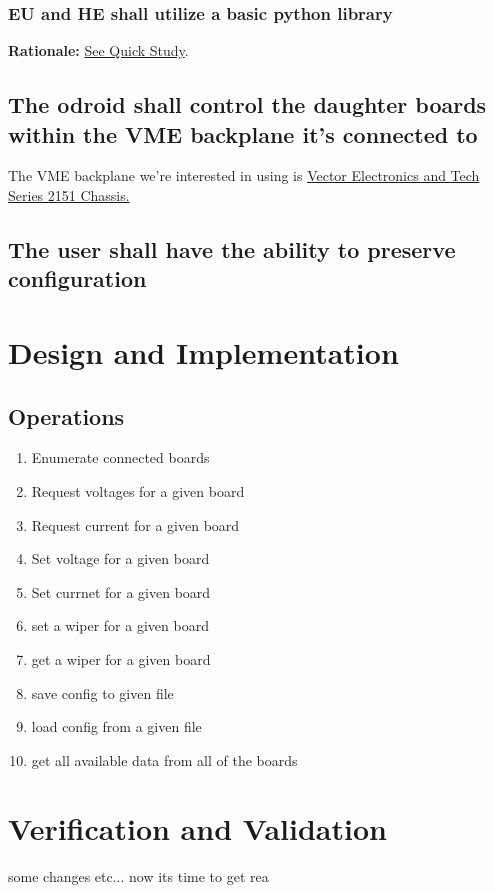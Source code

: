 \documentclass[11pt,letterpaper]{article}
\begin{document}
\subsubsection{EU and HE shall utilize a basic python library}
\textbf{Rationale:} \hyperref[sec:undefined_ui_req]{See Quick Study}.

\subsection{The odroid shall control the daughter boards within the VME backplane it's connected to}
The VME backplane we're interested in using is \href{https://www.vectorelect.com/series-2151.html}{Vector Electronics and Tech Series 2151 Chassis.}
\subsection{The user shall have the ability to preserve configuration}
%
%
%
\newpage
\section{Design and Implementation}

\subsection{Operations}
\begin{enumerate}
	\item Enumerate connected boards
	\item Request voltages for a given board
	\item Request current for a given board
	\item Set voltage for a given board
	\item Set currnet for a given board
	\item set a wiper for a given board
	\item get a wiper for a given board
	\item save config to given file
	\item load config from a given file
	\item get all available data from all of the boards
\end{enumerate}

\newpage
\section{Verification and Validation}
some changes etc...
now its time to get rea
\end{document}
